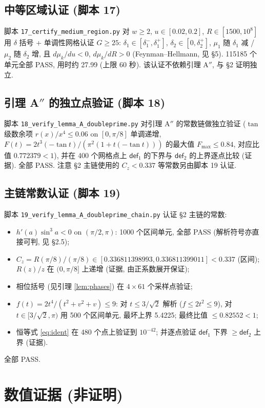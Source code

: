 \documentclass[UTF8]{ctexart}
\begin{document}
\subsection{中等区域认证 (脚本 17)}
脚本 \texttt{17\_certify\_medium\_region.py} 对 $w\ge2$, $u\in[0.02,0.2]$,
$R\in[1500,10^8]$ 用 $\delta$ 括号 + 单调性网格认证 $G\ge25$:
$\delta_1\in[\delta_1^-,\delta_1^+]$, $\delta_2\in[0,\delta_2^+]$,
$\mu_1$ 随 $\delta_1$ 减 / $\mu_2$ 随 $\delta_2$ 增, 且 $d\mu_k/du<0$,
$d\mu_k/dR>0$ (Feynman--Hellmann, 见 §5). 115185 个单元全部 PASS,
用时约 27.99 (上限 60 秒). 该认证不依赖引理 A$''$, 与 §2 证明独立.

\subsection{引理 A\texorpdfstring{$''$}{} 的独立点验证 (脚本 18)}
脚本 \texttt{18\_verify\_lemma\_A\_doubleprime.py} 对引理 A$''$ 的常数链做独立验证
($\tan$ 级数余项 $r(x)/x^4\le0.06$ on $[0,\pi/8]$ 单调递增, $F(t)=2t^3(-\tan t)/(\pi^2(1+t(-\tan t)))$
的最大值 $F_{\max}\le0.84$, 对应比值 $0.772379<1$), 并在 400 个网格点上
$\mathsf{def}_1$ 的下界与 $\mathsf{def}_2$ 的上界逐点比较 (证据). 全部 PASS.
注意 §2 主链使用的 $C_z<0.337$ 等常数另由脚本 19 认证.

\subsection{主链常数认证 (脚本 19)}
脚本 \texttt{19\_verify\_lemma\_A\_doubleprime\_chain.py} 认证 §2 主链的常数:
\begin{itemize}
	\item[(a)] $h'(a)\sin^3a<0$ on $(\pi/2,\pi)$: 1000 个区间单元, 全部 PASS
		(解析符号亦直接可判, 见 §2.5);
	\item[(b)] $C_z=R(\pi/8)/(\pi/8)\in[0.336811398993,0.336811399011]<0.337$
		(区间); $R(z)/z$ 在 $(0,\pi/8]$ 上递增 (证据, 由正系数展开保证);
	\item[(c)] 相位括号 (见引理 \ref{lem:phases}) 在 $4\times61$ 个采样点验证;
	\item[(d)] $f(t)=2t^4/(t^2+v^2+v)\le9$: 对 $t\le3/\sqrt2$ 解析 ($f\le2t^2\le9$),
		对 $t\in[3/\sqrt2,\pi)$ 用 500 个区间单元, 最坏上界 5.4225;
		最终比值 $\le0.82552<1$;
	\item[(e)] 恒等式 \eqref{eq:ident} 在 480 个点上验证到 $10^{-42}$;
		并逐点验证 $\mathsf{def}_1$ 下界 $\ge\mathsf{def}_2$ 上界 (证据).
\end{itemize}
全部 PASS.

\section{数值证据 (非证明)}\label{sec:numeric}
\end{document}
